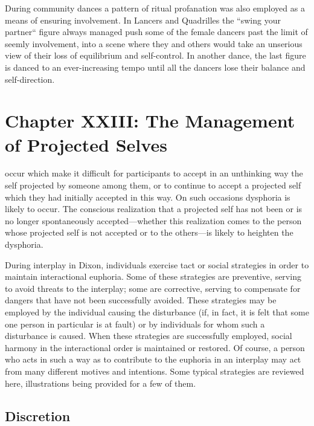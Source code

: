 \documentclass[openany,nobib]{tufte-book}
\let\oldchapter\chapter
\def\chapter{%
  \setcounter{footnote}{0}%
  \oldchapter
}
\begin{document}
During community dances a pattern of ritual profanation was also
employed as a means of ensuring involvement. In Lancers and Quadrilles
the ``swing your partner`` figure always managed push some of the female
dancers past the limit of seemly involvement, into a scene where they
and others would take an unserious view of their loss of equilibrium and
self-control. In another dance, the last figure is danced to an
ever-increasing tempo until all the dancers lose their balance and
self-direction.

\chapter[CHAPTER XXIII: THE MANAGEMENT OF PROJECTED SELVES]{Chapter XXIII: The Management of Projected Selves}
\label{ch:Chapter XXIII: The Management of Projected Selves}

occur which make it difficult for
participants to accept in an unthinking way the self projected by
someone among them, or to continue to accept a projected self which they
had initially accepted in this way. On such occasions dysphoria is
likely to occur. The conscious realization that a projected self has not
been or is no longer spontaneously accepted---whether this realization
comes to the person whose projected self is not accepted or to the
others---is likely to heighten the dysphoria.

During interplay in Dixon, individuals exercise tact or social
strategies in order to maintain interactional euphoria. Some of these
strategies are preventive, serving to avoid threats to the interplay;
some are corrective, serving to compensate for dangers that have not
been successfully avoided. These strategies may be employed by the
individual causing the disturbance (if, in fact, it is felt that some
one person in particular is at fault) or by individuals for whom such a
disturbance is caused. When these strategies are successfully employed,
social harmony in the interactional order is maintained or restored. Of
course, a person who acts in such a way as to contribute to the euphoria
in an interplay may act from many different motives and intentions. Some
typical strategies are reviewed here, illustrations being provided for a
few of them.

\hypertarget{discretion}{%
\section{Discretion}\label{discretion}}
\end{document}
